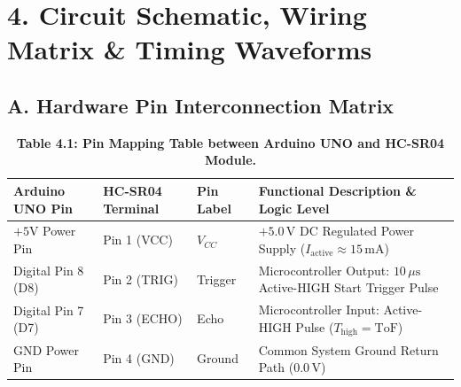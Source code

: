\documentclass[10pt,a4paper]{article}
\begin{document}
\section*{4. Circuit Schematic, Wiring Matrix \& Timing Waveforms}

\subsection*{A. Hardware Pin Interconnection Matrix}
\begin{table}[H]
\centering
\footnotesize
\renewcommand{\arraystretch}{1.15}
\begin{tabularx}{\textwidth}{|l|l|l|X|}
\hline
\textbf{Arduino UNO Pin} & \textbf{HC-SR04 Terminal} & \textbf{Pin Label} & \textbf{Functional Description \& Logic Level} \\
\hline
$+5\text{V}$ Power Pin & Pin 1 (VCC) & $V_{CC}$ & $+5.0\,\text{V}$ DC Regulated Power Supply ($I_{\text{active}} \approx 15\,\text{mA}$) \\
Digital Pin 8 (D8) & Pin 2 (TRIG) & Trigger & Microcontroller Output: $10\,\mu\text{s}$ Active-HIGH Start Trigger Pulse \\
Digital Pin 7 (D7) & Pin 3 (ECHO) & Echo & Microcontroller Input: Active-HIGH Pulse ($T_{\text{high}} = \text{ToF}$) \\
GND Power Pin & Pin 4 (GND) & Ground & Common System Ground Return Path ($0.0\,\text{V}$) \\
\hline
\end{tabularx}
\caption{\textbf{Table 4.1: Pin Mapping Table between Arduino UNO and HC-SR04 Module.}}
\end{table}
\end{document}
